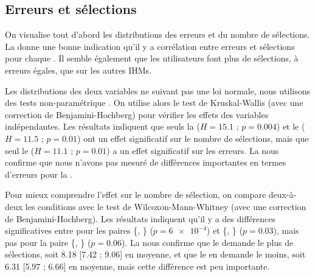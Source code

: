 \subsection{Erreurs et sélections}
\label{subsec:experiment_results_errors}


On visualise tout d'abord les distributions des erreurs et du nombre de sélections. La  donne une bonne indication qu'il y a corrélation entre erreurs et sélections pour chaque . Il semble également que les utilisateurs  font plus de sélections, à erreurs égales, que sur les autres IHMs.

Les distributions des deux variables ne suivant pas une loi normale, nous utilisons des tests non-paramétrique \citep{Wobbrock2016}. On utilise alors le test de Kruskal-Wallis (avec une correction de Benjamini-Hochberg) pour vérifier les effets des variables indépendantes. Les résultats indiquent que seuls la  ($H = \num{15.1}$ ; $p = \num{0.004}$) et le  ($H = \num{11.5}$ ; $p = \num{0.01}$) ont un effet significatif sur le nombre de sélections, mais que seul le  ($H = \num{11.1}$ ; $p = \num{0.01}$) a un effet significatif sur les erreurs. La  nous confirme que nous n'avons pas mesuré de différences importantes en termes d'erreurs pour la .


Pour mieux comprendre l'effet sur le nombre de sélection, on compare deux-à-deux les conditions  avec le test de Wilcoxon-Mann-Whitney (avec une correction de Benjamini-Hochberg). Les résultats indiquent qu'il y a des différences significatives entre pour les paires \{, \} ($p = \num{6e-4}$) et \{, \} ($p = \num{0.03}$), mais pas pour la paire \{, \} ($p = \num{0.06}$). La  nous confirme que le  demande le plus de sélections, soit \num{8.18} [\num{7.42} ; \num{9.06}] en moyenne, et que le  en demande le moins, soit \num{6.31} [\num{5.97} ; \num{6.66}] en moyenne, mais cette différence est peu importante.

